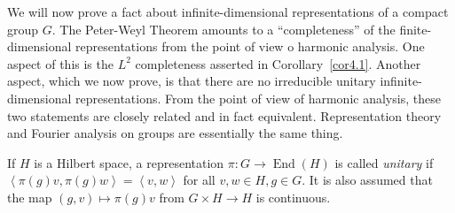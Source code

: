 \documentclass[12pt,reqno]{book}%
\theoremstyle{definition}
\theoremstyle{remark}
\theoremstyle{theorem}
\theoremstyle{remark}
\DeclareMathOperator{\End}{End}
\begin{document}
We will now prove a fact about infinite-dimensional representations of a compact group $G$.
The Peter-Weyl Theorem amounts to a ``completeness'' of the finite-dimensional representations from the point of view o harmonic analysis.
One aspect of this is the $L^2$ completeness asserted in Corollary~\ref{cor4.1}.
Another aspect, which we now prove, is that there are no irreducible unitary infinite-dimensional representations.
From the point of view of harmonic analysis, these two statements are closely related and in fact equivalent.
Representation theory and Fourier analysis on groups are essentially the same thing.

If $H$ is a Hilbert space, a representation $\pi : G \to \End(H)$ is called \emph{unitary} if ${\left\langle \pi(g)v, \pi(g)w\right\rangle} = {\left\langle v, w\right\rangle}$ for all $v, w \in H, g \in G$.
It is also assumed that the map $(g, v) \mapsto \pi(g)v$ from $G \times H \to H$ is continuous.
\end{document}
